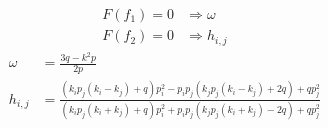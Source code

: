 \begin{frame} 
\[
\begin{aligned}
    F(f_1)=0 &\Rightarrow \omega \\ 
    F(f_2)=0 &\Rightarrow h_{i,j} 
\end{aligned}
\]
\[
\begin{aligned}
    \omega &= \frac{3q-k^2p}{2p} \\ 
    h_{i,j}&=\frac{(k_ip_j(k_i-k_j)+q)p_i^2-p_ip_j(k_jp_j(k_i-k_j)+2q)+qp_j^2}{(k_ip_j(k_i+k_j)+q)p_i^2+p_ip_j(k_jp_j(k_i+k_j)-2q)+qp_j^2}
\end{aligned}
\]
\begin{figure}
\centering 
{}
\end{figure}
\end{frame}

